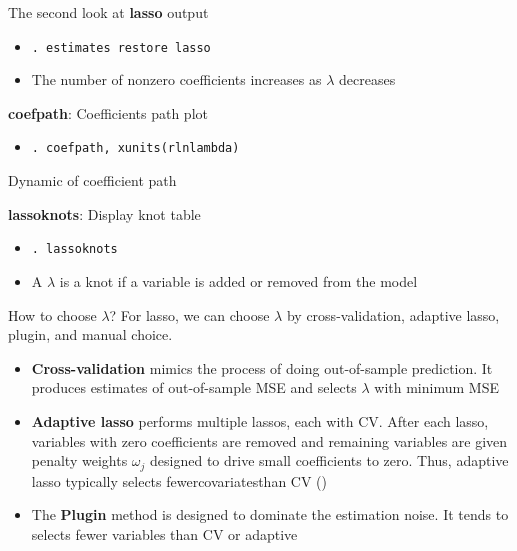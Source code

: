 \documentclass{beamer}
\begin{document}
\begin{frame}{The second look at \textbf{lasso} output}
	\begin{itemize}
		\item [] \small{\texttt{. estimates restore lasso}}
	\end{itemize}
	\begin{itemize}
		\item The number of nonzero coefficients increases as $\lambda$ decreases
	\end{itemize}
\end{frame}

\begin{frame}{\textbf{coefpath}: Coefficients path plot}
	\begin{itemize}
		\item [] \small{\texttt{. coefpath, xunits(rlnlambda)}}
	\end{itemize}
\end{frame}

\begin{frame}{Dynamic of coefficient path}

\end{frame}

\begin{frame}{\textbf{lassoknots}: Display knot table}
	\begin{itemize}
		\item [] \small{\texttt{. lassoknots}}
	\end{itemize}
	\begin{itemize}
		\item A $\lambda$ is a knot if a variable is {\color{red}added or removed} from the model
	\end{itemize}
\end{frame}

\begin{frame}{How to choose $\lambda$?}
	\label{choose}
	For lasso, we can choose $\lambda$ by cross-validation, adaptive lasso, plugin, and manual choice.	
	\begin{itemize}
		\item \textbf{Cross-validation} {\color{red}mimics the process of doing out-of-sample prediction}. It produces estimates of out-of-sample MSE and selects $\lambda$ with minimum MSE
		\item \textbf{Adaptive lasso} performs multiple lassos, each with CV. After each lasso, variables with zero coefficients are removed and remaining variables are given {\color{red}penalty weights $\omega_j$ designed to drive small coefficients to zero}. Thus, adaptive lasso typically selects fewercovariatesthan CV (\hyperlink{lasso formula}{})
		\item The \textbf{Plugin} method is designed to dominate the estimation noise. It tends to selects fewer variables than CV or adaptive
	\end{itemize}
\end{frame}
\end{document}
